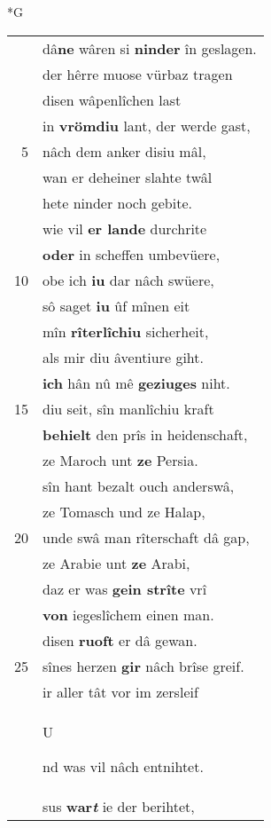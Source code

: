 \documentclass[8pt,a4paper,notitlepage]{article}
\begin{document}
\newpage
\begin{table}[ht]
\begin{minipage}[t]{0.5\linewidth}
\small
\begin{center}*G
\end{center}
\begin{tabular}{rl}
 & dâ\textbf{ne} wâren si \textbf{ninder} în geslagen.\\ 
 & der hêrre muose vürbaz tragen\\ 
 & disen wâpenlîchen last\\ 
 & in \textbf{vrömdiu} lant, der werde gast,\\ 
5 & nâch dem anker disiu mâl,\\ 
 & wan er deheiner slahte twâl\\ 
 & hete ninder noch gebite.\\ 
 & wie vil \textbf{er lande} durchrite\\ 
 & \textbf{oder} in scheffen umbevüere,\\ 
10 & obe ich \textbf{iu} dar nâch swüere,\\ 
 & sô saget \textbf{iu} ûf mînen eit\\ 
 & mîn \textbf{rîterlîchiu} sicherheit,\\ 
 & als mir diu âventiure giht.\\ 
 & \textbf{ich} hân nû mê \textbf{geziuges} niht.\\ 
15 & diu seit, sîn manlîchiu kraft\\ 
 & \textbf{behielt} den prîs in heidenschaft,\\ 
 & ze Maroch unt \textbf{ze} Persia.\\ 
 & sîn hant bezalt ouch anderswâ,\\ 
 & ze Tomasch und ze Halap,\\ 
20 & unde swâ man rîterschaft dâ gap,\\ 
 & ze Arabie unt \textbf{ze} Arabi,\\ 
 & daz er was \textbf{gein strîte} vrî\\ 
 & \textbf{von} iegeslîchem einen man.\\ 
 & disen \textbf{ruoft} er dâ gewan.\\ 
25 & sînes herzen \textbf{gir} nâch brîse greif.\\ 
 & ir aller tât vor im zersleif\\ 
 & \begin{large}U\end{large}nd was vil nâch entnihtet.\\ 
 & sus \textbf{war\textit{t}} ie der berihtet,\\ 

\end{tabular}
\end{minipage}
\end{table}
\end{document}
